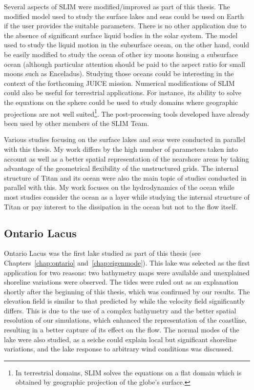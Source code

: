 Several aspects of SLIM were modified/improved as part of this thesis. The modified model used to study the surface lakes and seas could be used on Earth if the user provides the suitable parameters. There is no other application due to the absence of significant surface liquid bodies in the solar system. The model used to study the liquid motion in the subsurface ocean, on the other hand, could be easily modified to study the ocean of other icy moons housing a subsurface ocean (although particular attention should be paid to the aspect ratio for small moons such as Enceladus). Studying those oceans could be interesting in the context of the forthcoming JUICE mission. Numerical modifications of SLIM could also be useful for terrestrial applications. For instance, its ability to solve the equations on the sphere could be used to study domains where geographic projections are not well suited\footnote{In terrestrial domains, SLIM solves the equations on a flat domain which is obtained by geographic projection of the globe's surface.}. The post-processing tools developed have already been used by other members of the SLIM Team.

Various studies focusing on the surface lakes and seas were conducted in parallel with this thesis. My work differs by the high number of parameters taken into account as well as a better spatial representation of the nearshore areas by taking advantage of the geometrical flexibility of the unstructured grids. The internal structure of Titan and its ocean were also the main topic of studies conducted in parallel with this. My work focuses on the hydrodynamics of the ocean while most studies consider the ocean as a layer while studying the internal structure of Titan or pay interest to the dissipation in the ocean but not to the flow itself.



\subsection*{Ontario Lacus}

Ontario Lacus was the first lake studied as part of this thesis (see Chapters~\ref{chap:ontario} and~\ref{chap:eigenmode}). This lake was selected as the first application for two reasons: two bathymetry maps were available and unexplained shoreline variations were observed. The tides were ruled out as an explanation shortly after the beginning of this thesis, which was confirmed by our results. The elevation field is similar to that predicted by \cite{tokano2010simulation} while the velocity field significantly differs. This is due to the use of a complex bathymetry and the better spatial resolution of our simulations, which enhanced the representation of the coastline, resulting in a better capture of its effect on the flow. The normal modes of the lake were also studied, as a seiche could explain local but significant shoreline variations, and the lake response to arbitrary wind conditions was discussed. 

